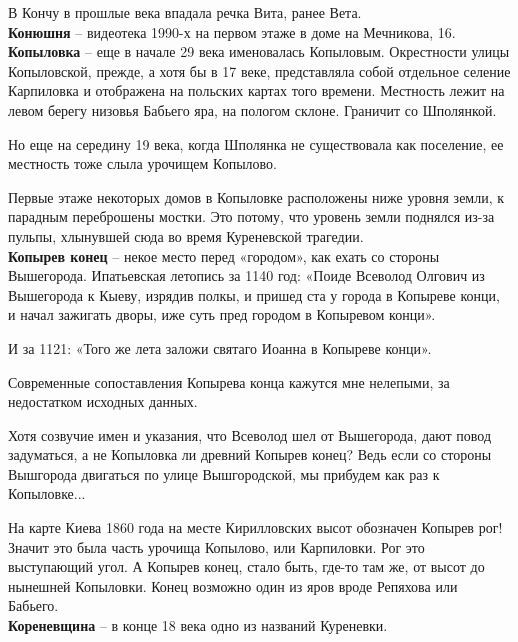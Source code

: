 В Кончу в прошлые века впадала речка Вита, ранее Вета.\\

\textbf{Конюшня} – видеотека 1990-х на первом этаже в доме на Мечникова, 16.\\

\textbf{Копыловка} – еще в начале 29 века именовалась Копыловым. Окрестности улицы Копыловской, прежде, а хотя бы в 17 веке, представляла собой отдельное селение Карпиловка и отображена на польских картах того времени. Местность лежит на левом берегу низовья Бабьего яра, на пологом склоне. Граничит со Шполянкой.

Но еще на середину 19 века, когда Шполянка не существовала как поселение, ее местность тоже слыла урочищем Копылово.

Первые этаже некоторых домов в Копыловке расположены ниже уровня земли, к парадным переброшены мостки. Это потому, что уровень земли поднялся из-за пульпы, хлынувшей сюда во время Куреневской трагедии.\\

\textbf{Копырев конец} – некое место перед «городом», как ехать со стороны Вышегорода. Ипатьевская летопись за 1140 год: «Поиде Всеволод Олгович из Вышегорода к Кыеву, изрядив полкы, и пришед ста у города в Копыреве конци, и начал зажигать дворы, иже суть пред городом в Копыревом конци».

И за 1121: «Того же лета заложи святаго Иоанна в Копыреве конци».

Современные сопоставления Копырева конца кажутся мне нелепыми, за недостатком исходных данных.

Хотя созвучие имен и указания, что Всеволод шел от Вышегорода, дают повод задуматься, а не Копыловка ли древний Копырев конец? Ведь если со стороны Вышгорода двигаться по улице Вышгородской, мы прибудем как раз к Копыловке...

На карте Киева 1860 года на месте Кирилловских высот обозначен Копырев рог! Значит это была часть урочища Копылово, или Карпиловки. Рог это выступающий угол. А Копырев конец, стало быть, где-то там же, от высот до нынешней Копыловки. Конец возможно один из яров вроде Репяхова или Бабьего.\\

\textbf{Кореневщина} – в конце 18 века одно из названий Куреневки.\\


